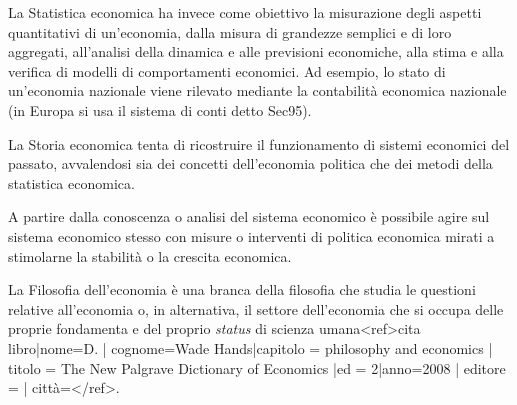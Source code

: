 La Statistica economica ha invece come obiettivo la misurazione degli 
aspetti quantitativi di un'economia, dalla misura di grandezze semplici e di 
loro aggregati, all'analisi della dinamica e alle previsioni economiche, alla 
stima e alla verifica di modelli di comportamenti economici. Ad esempio, lo 
stato di un'economia nazionale viene rilevato mediante la contabilità economica 
nazionale (in Europa si usa il sistema di conti detto Sec95).

La Storia economica tenta di ricostruire il funzionamento di sistemi 
economici del passato, avvalendosi sia dei concetti dell'economia politica 
che dei metodi della statistica economica.

A partire dalla conoscenza o analisi del sistema economico è possibile agire 
sul sistema economico stesso con misure o interventi di politica economica 
mirati a stimolarne la stabilità o la crescita economica.

La Filosofia dell'economia è una branca della filosofia che studia le 
questioni relative all'economia o, in alternativa, il settore dell'economia che 
si occupa delle proprie fondamenta e del proprio \emph{status} di scienza 
umana<ref>{{cita libro|nome=D. | cognome=Wade Hands|capitolo = philosophy and 
economics | titolo = The New Palgrave Dictionary of Economics |ed = 
2|anno=2008 | editore = | città=}}</ref>.

